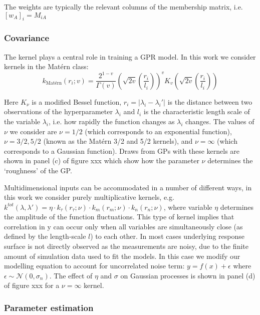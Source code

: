 The weights are typically the relevant columns of the membership matrix, i.e. $\left[w_{A}\right]_{i}=M_{i A}$


\subsubsection{Covariance}
The kernel plays a central role in training a GPR model. In this work we consider kernels in the Mat{\'e}rn class: 
\begin{equation}
k_{\text {Mat{\'e}rn}}\left(r_{i} ; v\right)=\frac{2^{1-v}}{\Gamma(v)}\left(\sqrt{2 v}\left(\frac{r_{i}}{l_{i}}\right)\right)^{v} K_{v}\left(\sqrt{2 v}\left(\frac{r_{i}}{l_{i}}\right)\right)
\end{equation}

Here $K_{\nu}$ is a modified Bessel function, $r_i=|\lambda_i-\lambda_i'|$ is the distance between two observations of the hyperparameter $\lambda_i$ and $l_i$ is the characteristic length scale of the variable $\lambda_i$, i.e. how rapidly the function changes as $\lambda_i$ changes. The values of $\nu$ we consider are $\nu=1/2$ (which corresponds to an exponential function), $\nu=3/2,5/2$ (known as the Matérn 3/2 and 5/2 kernels), and $\nu=\infty$ (which corresponds to a Gaussian function). Draws from GPs with these kernels are shown in panel (c) of figure xxx which show how the parameter $\nu$ determines the ‘roughness’ of the GP. 

Multidimensional inputs can be accommodated in a number of different ways, in this work we consider purely multiplicative kernels, e.g. $k^{tot}(\lambda,\lambda')=\eta\cdot k_{\tau} (r_{\tau};\nu)\cdot k_m (r_m;\nu)\cdot k_n (r_n;\nu)$, where variable $\eta$ determines the amplitude of the function fluctuations. This type of kernel implies that correlation in y can occur only when all variables are simultaneously close (as defined by the length-scale $l$) to each other. In most cases underlying response surface is not directly observed as the measurements are noisy, due to the finite amount of simulation data used to fit the models. In this case we modify our modelling equation to account for uncorrelated noise term: $y=f(x)+\epsilon$ where $\epsilon  \sim \mathcal{N}(0,\sigma_{n} )$. The effect of $\eta$ and $\sigma$ on Gaussian processes is shown in panel (d) of figure xxx for a $\nu = \infty$ kernel. 

\subsubsection{Parameter estimation}

